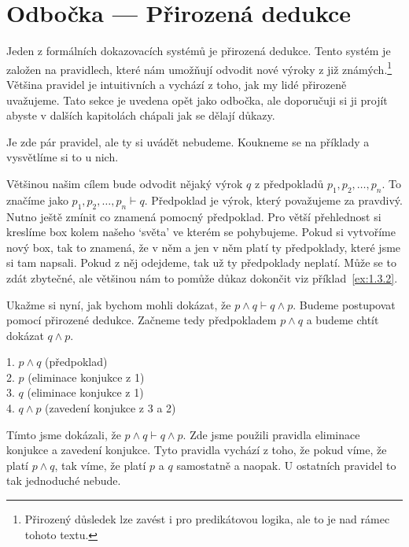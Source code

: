 \section{Odbočka --- Přirozená dedukce}
Jeden z formálních dokazovacích systémů je přirozená dedukce. Tento systém je založen na pravidlech, které nám umožňují odvodit nové výroky z již známých.\footnote{Přirozený důsledek lze zavést i pro predikátovou logika, ale to je nad rámec tohoto textu.} Většina pravidel je intuitivních a vychází z toho, jak my lidé přirozeně uvažujeme. Tato sekce je uvedena opět jako odbočka, ale doporučuji si ji projít abyste v dalších kapitolách chápali jak se dělají důkazy.

Je zde pár pravidel, ale ty si uvádět nebudeme. Koukneme se na příklady a vysvětlíme si to u nich.

\begin{definitionbox}
  Většinou našim cílem bude odvodit nějaký výrok $q$ z předpokladů $p_1, p_2, \ldots, p_n$. To značíme jako $p_1, p_2, \ldots, p_n \vdash q$.  Předpoklad je výrok, který považujeme za pravdivý. Nutno ještě zmínit co znamená pomocný předpoklad. Pro větší přehlednost si kreslíme box kolem našeho `světa' ve kterém se pohybujeme. Pokud si vytvoříme nový box, tak to znamená, že v něm a jen v něm platí ty předpoklady, které jsme si tam napsali. Pokud z něj odejdeme, tak už ty předpoklady neplatí. Může se to zdát zbytečné, ale většinou nám to pomůže důkaz dokončit viz příklad~\ref{ex:1.3.2}.
\end{definitionbox}

\begin{example}
  Ukažme si nyní, jak bychom mohli dokázat, že $p \land q \vdash q \land p$. Budeme postupovat pomocí přirozené dedukce. Začneme tedy předpokladem $p \land q$ a budeme chtít dokázat $q \land p$. 
  \begin{proofbox}
    1. $p \land q$ (předpoklad) \\
    2. $p$ (eliminace konjukce z 1) \\
    3. $q$ (eliminace konjukce z 1) \\
    4. $q \land p$ (zavedení konjukce z 3 a 2)
  \end{proofbox}
  Tímto jsme dokázali, že $p \land q \vdash q \land p$. Zde jsme použili pravidla eliminace konjukce a zavedení konjukce. Tyto pravidla vychází z toho, že pokud víme, že platí $p \land q$, tak víme, že platí $p$ a $q$ samostatně a naopak. U ostatních pravidel to tak jednoduché nebude.
\end{example}

